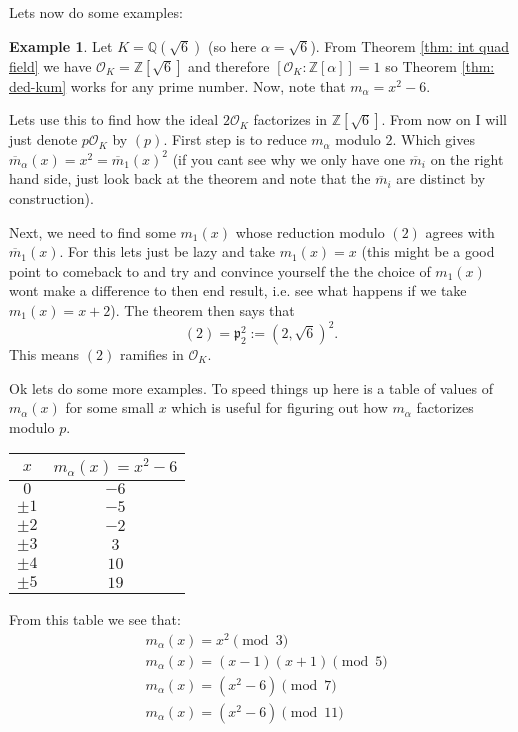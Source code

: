 \documentclass[11pt,a4paper]{report}
\theoremstyle{plain}
\theoremstyle{definition}
\newtheorem{exmp}[subsection]{Example}
\theoremstyle{definition}
\newcommand{\ZZ}{\mathbb{Z}}
\def\QQ{\mathbb{Q}}
\def\gothp{\mathfrak{p}}
\def \a{\alpha}
\def \OO {\mathcal{O}}
\def \ov{\overline}
\begin{document}
Lets now do some examples:


\begin{exmp}
Let $K=\QQ(\sqrt{6})$ (so here $\a=\sqrt{6}$). From Theorem \ref{thm: int quad field} we have $\OO_K=\ZZ[\sqrt{6}]$ and therefore $[\OO_K:\ZZ[\a]]=1$ so Theorem \ref{thm: ded-kum} works for any prime number.  Now, note that $m_\a=x^2-6$. 

Lets use this to find how the ideal $2\OO_K$ factorizes in $\ZZ[\sqrt{6}]$. From now on I will just denote $p\OO_K$ by $(p)$. First step is to reduce $m_\a$ modulo $2$. Which gives $\ov{m}_\a(x)=x^2=\ov{m}_1(x)^2$ (if you cant see why we only have one $\ov{m}_i$ on the right hand side, just look back at the theorem and note that the $\ov{m}_i$ are distinct by construction). 

Next, we need to find some $m_1(x)$ whose reduction modulo $(2)$ agrees with $\ov{m}_1(x)$. For this lets just be lazy and take $m_1(x)=x$ (this might be a good point to comeback to and try and convince yourself the the choice of $m_1(x)$ wont make a difference to then end result, i.e. see what happens if we take $m_1(x)=x+2$). The theorem then says that \[(2)=\gothp_2^2:=(2,\sqrt{6})^2.\] This means $(2)$ ramifies in $\OO_K$.

Ok lets do some more examples. To speed things up here is a table of values of $m_\a(x)$ for some small $x$ which is useful for figuring out how $m_\a$ factorizes modulo $p$.
\begin{center}
	
	\begin{tabular}{ | c | c | }
		\hline
		
		$x$ &   $m_\a(x)=x^2-6$  \\ \hline
		$0$ & $-6$ \\  \hline
		$\pm 1$ & $-5$ \\  \hline
		$\pm 2$ & $-2$ \\  \hline
		$\pm 3$ & $3$ \\  \hline	
		$\pm 4$ & $10$ \\  \hline
		$\pm 5$ & $19$ \\  \hline	
	\end{tabular}			
\end{center}

From this table we see that:
\begin{align*}
	&m_\a(x)=x^2 \pmod 3\\
	&m_\a(x)=(x-1)(x+1) \pmod 5\\
	&m_\a(x)=(x^2-6) \pmod 7\\
	&m_\a(x)=(x^2-6) \pmod {11}\\
\end{align*}


\end{exmp}
\end{document}

